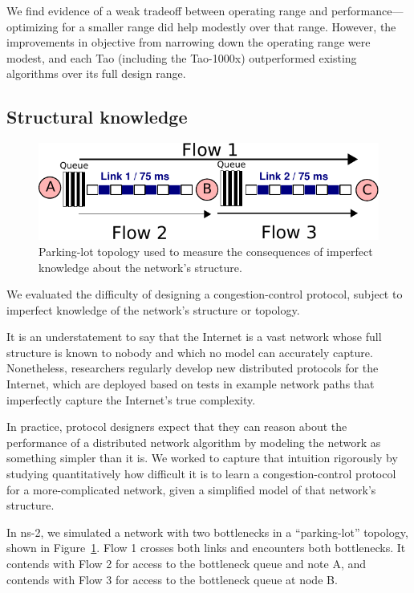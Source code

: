 We find evidence of a weak tradeoff between operating range and
performance---optimizing for a smaller range did help modestly over
that range.  However, the improvements in objective from narrowing
down the operating range were modest, and each Tao (including the
Tao-1000x) outperformed existing algorithms over its full design
range.

\subsection{Structural knowledge}
\label{ss:topological}

\begin{figure}
\includegraphics[width=\columnwidth]{twolink.pdf}
\caption{Parking-lot topology used to measure the consequences of imperfect
knowledge about the network's structure.}
\label{fig:two-link}
\end{figure}

We evaluated the difficulty of designing a congestion-control
protocol, subject to imperfect knowledge of the network's structure or
topology.

It is an understatement to say that the Internet is a vast network
whose full structure is known to nobody and which no model can
accurately capture. Nonetheless, researchers regularly develop new
distributed protocols for the Internet, which are deployed based on
tests in example network paths that imperfectly capture the Internet's
true complexity.

In practice, protocol designers expect that they can reason about the
performance of a distributed network algorithm by modeling the network
as something simpler than it is. We worked to capture that intuition
rigorously by studying quantitatively how difficult it is to learn a
congestion-control protocol for a more-complicated network, given a
simplified model of that network's structure.

In ns-2, we simulated a network with two bottlenecks in a
``parking-lot'' topology, shown in Figure~\ref{fig:two-link}. Flow 1
crosses both links and encounters both bottlenecks. It contends with
Flow 2 for access to the bottleneck queue and note A, and contends
with Flow 3 for access to the bottleneck queue at node B.

